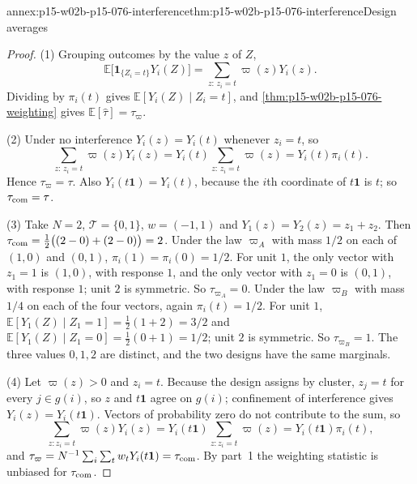 \begin{annexitem}{annex:p15-w02b-p15-076-interference}{thm:p15-w02b-p15-076-interference}{Design averages}
\begin{proof}
(1) Grouping outcomes by the value \(z\) of \(Z\),
\[
 \mathbb E\bigl[\mathbf 1_{\{Z_i=t\}}Y_i(Z)\bigr]
 =\sum_{z:\,z_i=t}\varpi(z)Y_i(z).
\]
Dividing by \(\pi_i(t)\) gives \(\mathbb E[Y_i(Z)\mid Z_i=t]\), and
\cref{thm:p15-w02b-p15-076-weighting} gives
\(\mathbb E[\widehat\tau]=\tau_\varpi\).

(2) Under no interference \(Y_i(z)=Y_i(t)\) whenever \(z_i=t\), so
\[
 \sum_{z:\,z_i=t}\varpi(z)Y_i(z)=Y_i(t)\sum_{z:\,z_i=t}\varpi(z)
 =Y_i(t)\pi_i(t).
\]
Hence \(\tau_\varpi=\tau\). Also \(Y_i(t\mathbf 1)=Y_i(t)\), because the
\(i\)th coordinate of \(t\mathbf 1\) is \(t\); so \(\tau_{\rm com}=\tau\).

(3) Take \(N=2\), \(\mathcal T=\{0,1\}\), \(w=(-1,1)\) and
\(Y_1(z)=Y_2(z)=z_1+z_2\). Then \(\tau_{\rm com}=\tfrac12\bigl((2-0)+(2-0)\bigr)=2\).
Under the law \(\varpi_A\) with mass \(1/2\) on each of \((1,0)\) and
\((0,1)\), \(\pi_i(1)=\pi_i(0)=1/2\). For unit \(1\), the only vector with
\(z_1=1\) is \((1,0)\), with response \(1\), and the only vector with
\(z_1=0\) is \((0,1)\), with response \(1\); unit \(2\) is symmetric. So
\(\tau_{\varpi_A}=0\). Under the law \(\varpi_B\) with mass \(1/4\) on each
of the four vectors, again \(\pi_i(t)=1/2\). For unit \(1\),
\(\mathbb E[Y_1(Z)\mid Z_1=1]=\tfrac12(1+2)=3/2\) and
\(\mathbb E[Y_1(Z)\mid Z_1=0]=\tfrac12(0+1)=1/2\); unit \(2\) is
symmetric. So \(\tau_{\varpi_B}=1\). The three values \(0,1,2\) are
distinct, and the two designs have the same marginals.

(4) Let \(\varpi(z)>0\) and \(z_i=t\). Because the design assigns by
cluster, \(z_j=t\) for every \(j\in g(i)\), so \(z\) and \(t\mathbf 1\)
agree on \(g(i)\); confinement of interference gives
\(Y_i(z)=Y_i(t\mathbf 1)\). Vectors of probability zero do not contribute
to the sum, so
\[
 \sum_{z:z_i=t}\varpi(z)Y_i(z)=Y_i(t\mathbf 1)\sum_{z:z_i=t}\varpi(z)
 =Y_i(t\mathbf 1)\pi_i(t),
\]
and \(\tau_\varpi=N^{-1}\sum_i\sum_tw_tY_i(t\mathbf 1)=\tau_{\rm com}\).
By part~1 the weighting statistic is unbiased for \(\tau_{\rm com}\).
\end{proof}
\end{annexitem}

